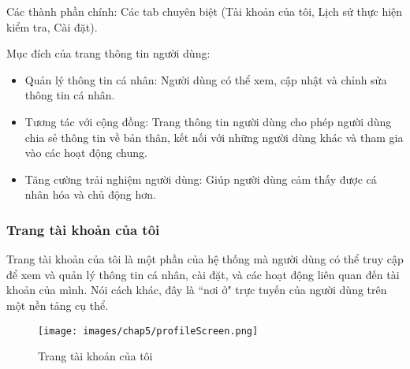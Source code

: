 Các thành phần chính: Các tab chuyên biệt (Tài khoản của tôi, Lịch sử thực hiện kiểm tra, Cài đặt).

Mục đích của trang thông tin người dùng:
\begin{itemize}
    \item Quản lý thông tin cá nhân: Người dùng có thể xem, cập nhật và chỉnh sửa thông tin cá nhân.
    \item Tương tác với cộng đồng: Trang thông tin người dùng cho phép người dùng chia sẻ thông tin về bản thân, kết nối với những người dùng khác và tham gia vào các hoạt động chung.
    \item Tăng cường trải nghiệm người dùng: Giúp người dùng cảm thấy được cá nhân hóa và chủ động hơn.
\end{itemize}


\subsubsection{Trang tài khoản của tôi}
Trang tài khoản của tôi là một phần của hệ thống mà người dùng có thể truy cập để xem và quản lý thông tin cá nhân, cài đặt, và các hoạt động liên quan đến tài khoản của mình. Nói cách khác, đây là ``nơi ở" trực tuyến của người dùng trên một nền tảng cụ thể.

\begin{figure}[H]
    \centering
    \texttt{[image: images/chap5/profileScreen.png]}
    \vspace{0.5cm}
    \caption{Trang tài khoản của tôi}
\end{figure}

